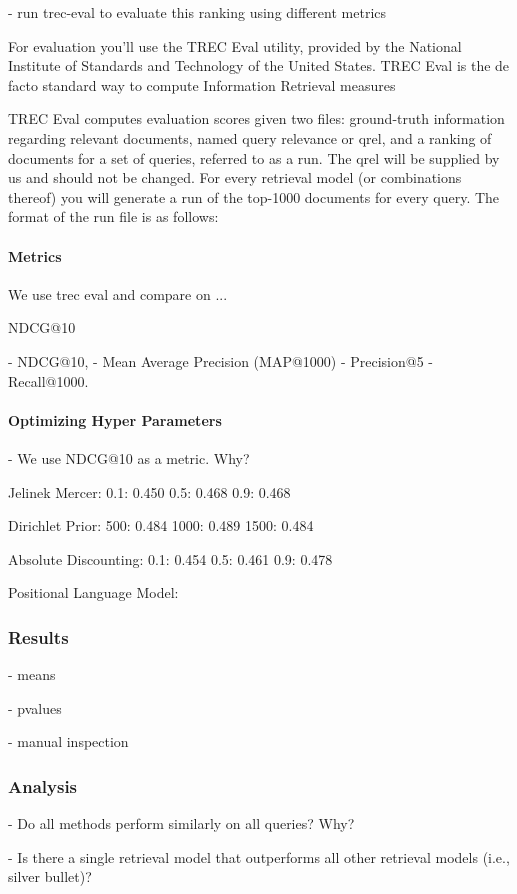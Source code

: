 - run trec-eval to evaluate this ranking using different metrics



For evaluation you'll use the TREC Eval utility, provided by the National Institute of Standards and Technology of the United States. TREC Eval is the de facto standard way to compute Information Retrieval measures

TREC Eval computes evaluation scores given two files: ground-truth information regarding relevant documents, named query relevance or qrel, and a ranking of documents for a set of queries, referred to as a run. The qrel will be supplied by us and should not be changed. For every retrieval model (or combinations thereof) you will generate a run of the top-1000 documents for every query. The format of the run file is as follows:


\paragraph{Metrics}

We use trec eval and compare on ...

NDCG@10

- NDCG@10, 
- Mean Average Precision (MAP@1000) 
- Precision@5
- Recall@1000.

\paragraph{Optimizing Hyper Parameters}

- We use NDCG@10 as a metric. Why?

Jelinek Mercer:
0.1: 0.450
0.5: 0.468
0.9: 0.468

Dirichlet Prior:
500: 0.484
1000: 0.489
1500: 0.484

Absolute Discounting:
0.1: 0.454
0.5: 0.461
0.9: 0.478

Positional Language Model:




\subsubsection{Results}

- means



- pvalues

- manual inspection

\subsubsection{Analysis}

- Do all methods perform similarly on all queries? Why?

- Is there a single retrieval model that outperforms all other retrieval models (i.e., silver bullet)?